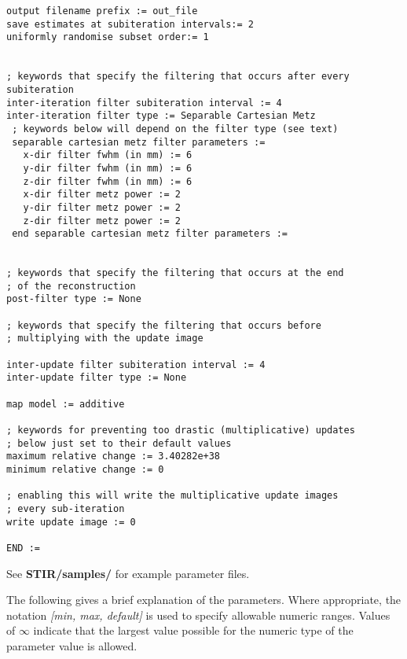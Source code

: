 \documentclass{article}
\begin{document}
\begin{verbatim}
output filename prefix := out_file
save estimates at subiteration intervals:= 2
uniformly randomise subset order:= 1


; keywords that specify the filtering that occurs after every subiteration
inter-iteration filter subiteration interval := 4
inter-iteration filter type := Separable Cartesian Metz
 ; keywords below will depend on the filter type (see text)
 separable cartesian metz filter parameters := 
   x-dir filter fwhm (in mm) := 6 
   y-dir filter fwhm (in mm) := 6 
   z-dir filter fwhm (in mm) := 6 
   x-dir filter metz power := 2 
   y-dir filter metz power := 2 
   z-dir filter metz power := 2 
 end separable cartesian metz filter parameters := 


; keywords that specify the filtering that occurs at the end
; of the reconstruction
post-filter type := None

; keywords that specify the filtering that occurs before 
; multiplying with the update image

inter-update filter subiteration interval := 4
inter-update filter type := None

map model := additive

; keywords for preventing too drastic (multiplicative) updates
; below just set to their default values
maximum relative change := 3.40282e+38
minimum relative change := 0

; enabling this will write the multiplicative update images 
; every sub-iteration
write update image := 0

END :=
\end{verbatim}

See \textbf{STIR/samples/} for example parameter files.

The following gives a brief explanation of the parameters. Where 
appropriate, the notation \textit{[min, max, default]} is used to 
specify allowable numeric ranges. Values of \textit{\ensuremath{\infty}} indicate 
that the largest value possible for the numeric type of the parameter 
value is allowed.

{ 
}
\label{sec:PoissonProjectionDataObjectiveFunction}
\end{document}
